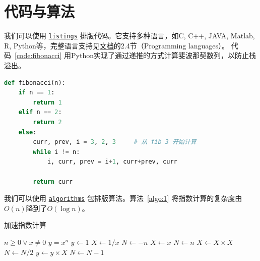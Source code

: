 \documentclass[zihao = -4, linespread = 1.5]{ctexart}
\begin{document}
\section{代码与算法}
我们可以使用 \href{https://ctan.org/pkg/listings?lang=en}{\texttt{listings}} 排版代码。它支持多种语言，如C, C++, JAVA, Matlab, R, Python等，完整语言支持见\href{https://ctan.mirrors.hoobly.com/macros/latex/contrib/listings/listings.pdf}{文档}的2.4节（Programming languages）。
代码~\ref{code:fibonacci} 用Python实现了通过递推的方式计算斐波那契数列，以防止栈溢出。
\begin{lstlisting}[language=Python, caption=计算斐波那契数列,label=code:fibonacci]
def fibonacci(n):
    if n == 1:
        return 1
    elif n == 2:
        return 2
    else:
        curr, prev, i = 3, 2, 3     # 从 fib 3 开始计算
        while i != n:
            i, curr, prev = i+1, curr+prev, curr

        return curr
\end{lstlisting}
% 

我们可以使用 \href{https://ctan.org/pkg/algorithms}{\texttt{algorithms}} 包排版算法。算法~\ref{algo:1} 将指数计算的复杂度由$O(n)$降到了$O(\log n)$。
\begin{algorithm}
  \caption{加速指数计算}
  \label{algo:1}
  \begin{algorithmic}
  \REQUIRE $n \geq 0 \vee x \neq 0$
  \ENSURE $y = x^n$
  \STATE $y \gets 1$
  \STATE $X \gets 1 / x$
  \STATE $N \gets -n$
  \ELSE
  \STATE $X \gets x$
  \STATE $N \gets n$
  \ENDIF
  \STATE $X \gets X \times X$
  \STATE $N \gets N / 2$
  \ELSE[$N$ is odd]
  \STATE $y \gets y \times X$
  \STATE $N \gets N - 1$
  \ENDIF
  \ENDWHILE
  \end{algorithmic}
\end{algorithm}


%
\end{document}
